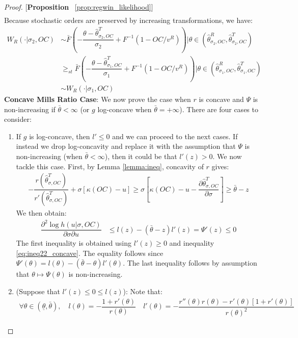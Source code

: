 \begin{proof}{[\textbf{Proposition} ~\ref{prop:regwin_likelihood}]}
\begin{align*}
\end{align*}
Because stochastic orders are preserved by increasing transformations, we have:
\begin{align*}
  W_R(\cdot|\sigma_2,OC) &\sim \bar{F}\left(-\dfrac{\theta - \hat{\theta}^T_{\sigma_2,OC}}{\sigma_2} + F^{-1}(1-OC/v^R)\right)|\theta\in (\hat{\theta}^R_{\sigma_2,OC}, \hat{\theta}^T_{\sigma_2,OC})\\ 
  &\geq_{st} \bar{F}\left(-\dfrac{\theta - \hat{\theta}^T_{\sigma_1,OC}}{\sigma_1}+F^{-1}(1-OC/v^R)\right)|\theta\in (\hat{\theta}^R_{\sigma_1,OC}, \hat{\theta}^T_{\sigma_1,OC}) \\
  &\sim W_R(\cdot|\sigma_1,OC)
\end{align*}
\noindent \textbf{Concave Mills Ratio Case}: We now prove the case when $r$ is concave and $\Psi$ is non-increasing if $\bar{\theta} < \infty$ (or $g$ log-concave when $\bar{\theta}=+\infty$). There are four cases to consider:
\vspace{-5pt}
\begin{enumerate}[label=(\arabic*),ref=\thelemma(\arabic*)]
  \item If $g$ is log-concave, then $l'\leq 0$ and we can proceed to the next cases. If instead we drop log-concavity and replace it with the assumption that $\Psi$ is non-increasing (when $\bar{\theta}<\infty$), then it could be that $l'(z) >  0$. We now tackle this case. First, by Lemma \ref{lemma:ineq}, concavity of $r$ gives:
  \begin{align}\label{eq:ineq22_concave}
  -\dfrac{r(\hat{\theta}^T_{\sigma,OC})}{r'(\hat{\theta}^T_{\sigma,OC})} + \sigma[\kappa(OC)-u] \geq \sigma\left[\kappa(OC)-u-\dfrac{\partial \hat{\theta}^T_{\sigma,OC}}{\partial \sigma}\right] \geq \bar{\theta} - z
  \end{align}
  We then obtain:
  \begin{align*}
      \dfrac{\partial^2 \log h(u|\sigma,OC)}{\partial \sigma \partial u} &\leq l(z) - (\bar{\theta} - z)l'(z)  = \Psi'(z) \leq 0
  \end{align*}
  The first inequality is obtained using $l'(z)\geq 0$ and inequality \eqref{eq:ineq22_concave}. The equality follows since $\Psi'(\theta) = l(\theta) - (\bar{\theta}-\theta)l'(\theta)$. The last inequality follows by assumption that $\theta\mapsto \Psi(\theta)$ is non-increasing. 
  \item (Suppose that $l'(z) \leq 0 \leq l(z)$):   Note that:
  \begin{gather*}
    \forall \theta\in (\underline{\theta},\bar{\theta}),\quad l(\theta) = -\dfrac{1+r'(\theta)}{r(\theta)} \quad l'(\theta) = -\dfrac{r''(\theta)r(\theta) - r'(\theta)[1+r'(\theta)]}{r(\theta)^2}

\end{gather*}
\end{enumerate}
\end{proof}
